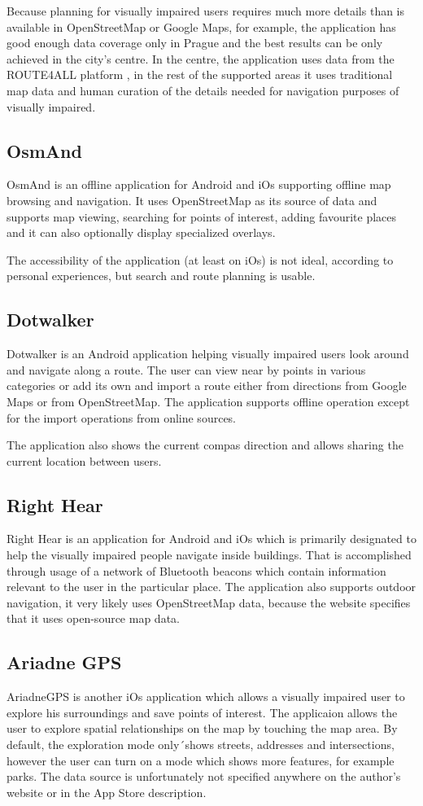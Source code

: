 \documentclass[nolof,digital]{fithesis3}
\begin{document}
Because planning for visually impaired users requires much more details than is available in OpenStreetMap or Google Maps, for example, the application has good enough data coverage only in Prague and the best results can be only achieved in the city's centre. In the centre, the application uses data from the ROUTE4ALL platform \parencite{route4all}, in the rest of the supported areas it uses traditional map data and human curation of the details needed for navigation purposes of visually impaired.
\subsection{OsmAnd}
OsmAnd \parencite{osmand} is an offline application for Android and iOs supporting offline map browsing and navigation. It uses OpenStreetMap as its source of data and supports map viewing, searching for points of interest, adding favourite places and it can also optionally display specialized overlays.

The accessibility of the application (at least on iOs) is not ideal, according to personal experiences, but search and route planning is usable.
\subsection{Dotwalker}
Dotwalker \parencite{dotwalker} is an Android application helping visually impaired users look around and navigate along a route. The user can view near by points in various categories or add its own and import a route either from directions from Google Maps or from OpenStreetMap. The application supports offline operation except for the import operations from online sources.

The application also shows the current compas direction and allows sharing the current location between users.
\subsection{Right Hear}
Right Hear \parencite{righthear} is an application for Android and iOs which is primarily designated to help the visually impaired people navigate inside buildings. That is accomplished through usage of a network of Bluetooth beacons which contain information relevant to the user in the particular place. The application also supports outdoor navigation, it very likely uses OpenStreetMap data, because the website specifies that it uses open-source map data.
\subsection{Ariadne GPS}
AriadneGPS \parencite{ariadnegps} is another iOs application which allows a visually impaired  user to explore his surroundings and save points of interest. The applicaion allows the user to explore spatial relationships on the map by touching the map area. By default, the exploration mode only´shows streets, addresses and intersections, however the user can turn on a mode which shows more features, for example parks. The data source is unfortunately not specified anywhere on the author's website or in the App Store description.
\end{document}
